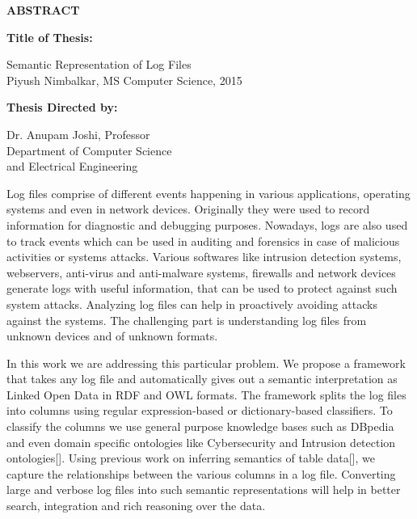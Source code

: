 \newpage
\pagestyle{empty}

\begin{center}
\vspace{0.1in}
\large{\bf ABSTRACT} \par  
\bigskip \bigskip
\end{center}

{\bf Title of Thesis:} \parbox[t]{4.5in}{{Semantic Representation of Log Files\\
Piyush Nimbalkar, MS Computer Science, 2015\\}}
\begin{singlespace}
{\bf Thesis Directed by:}{\hspace{2.5mm}} \parbox[t]{3in}{Dr. Anupam Joshi, Professor\\
Department of Computer Science\\ 
and Electrical Engineering\\}
\end{singlespace}

Log files comprise of different events happening in various applications, operating systems and even in network devices. Originally they were used to record information for diagnostic and debugging purposes. Nowadays, logs are also used to track events which can be used in auditing and forensics in case of malicious activities or systems attacks. Various softwares like intrusion detection systems, webservers, anti-virus and anti-malware systems, firewalls and network devices generate logs with useful information, that can be used to protect against such system attacks. Analyzing log files can help in proactively avoiding attacks against the systems. The challenging part is understanding log files from unknown devices and of unknown formats.

In this work we are addressing this particular problem. We propose a framework that takes any log file and automatically gives out a semantic interpretation as Linked Open Data in RDF and OWL formats. The framework splits the log files into columns using regular expression-based or dictionary-based classifiers. To classify the columns we use general purpose knowledge bases such as DBpedia and even domain specific ontologies like Cybersecurity and Intrusion detection ontologies[]. Using previous work on inferring semantics of table data[], we capture the relationships between the various columns in a log file. Converting large and verbose log files into such semantic representations will help in better search, integration and rich reasoning over the data.

\par\vfil

